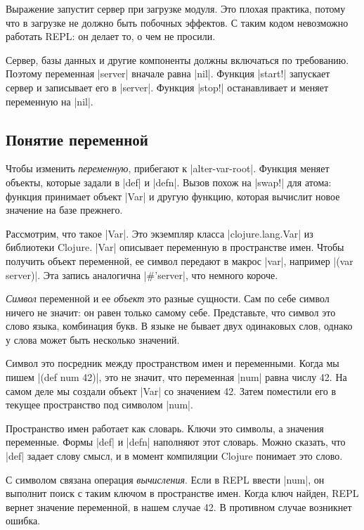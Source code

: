 Выражение запустит сервер при загрузке модуля. Это плохая практика, потому что в
загрузке не должно быть побочных эффектов. С таким кодом невозможно работать
REPL: он делает то, о чем не просили.

Сервер, базы данных и другие компоненты должны включаться по требованию. Поэтому
переменная \spverb|server| вначале равна \spverb|nil|. Функция \spverb|start!|
запускает сервер и записывает его в \spverb|server|. Функция \spverb|stop!|
останавливает и меняет переменную на \spverb|nil|.

\subsection{Понятие переменной}

Чтобы изменить \emph{переменную}, прибегают к \spverb|alter-var-root|. Функция
меняет объекты, которые задали в \spverb|def| и \spverb|defn|. Вызов похож на
\spverb|swap!| для атома: функция принимает объект \spverb|Var| и другую
функцию, которая вычислит новое значение на базе прежнего.

Рассмотрим, что такое \spverb|Var|. Это экземпляр класса \spverb|clojure.lang.Var|
из библиотеки Clojure. \spverb|Var| описывает переменную в пространстве имен.
Чтобы получить объект переменной, ее символ передают в макрос \spverb|var|,
например \spverb|(var server)|. Эта запись аналогична \spverb|#'server|,
что немного короче.

\emph{Символ} переменной и ее \emph{объект} это разные сущности. Сам по себе
символ ничего не значит: он равен только самому себе. Представьте, что символ
это слово языка, комбинация букв. В языке не бывает двух одинаковых слов, однако
у слова может быть несколько значений.

Символ это посредник между пространством имен и переменными. Когда мы пишем
\spverb|(def num 42)|, это не значит, что переменная \spverb|num| равна числу
42. На самом деле мы создали объект \spverb|Var| со значением 42. Затем
поместили его в текущее пространство под символом \spverb|num|.

Пространство имен работает как словарь. Ключи это символы, а значения
переменные. Формы \spverb|def| и \spverb|defn| наполняют этот словарь. Можно
сказать, что \spverb|def| задает слову смысл, и в момент компиляции Clojure
понимает это слово.

С символом связана операция \emph{вычисления}. Если в REPL ввести \spverb|num|,
он выполнит поиск с таким ключом в пространстве имен. Когда ключ найден, REPL
вернет значение переменной, в нашем случае 42. В противном случае возникнет
ошибка.

